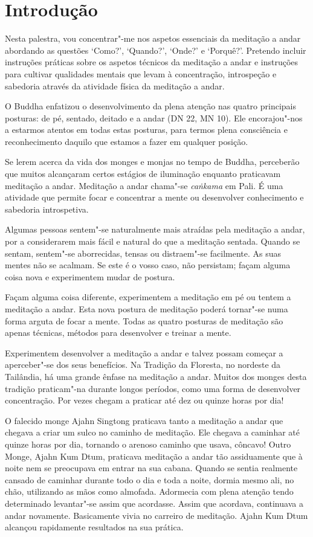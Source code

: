 \chapter{Introdução}

Nesta palestra, vou concentrar"-me nos aspetos essenciais da meditação a
andar abordando as questões `Como?', `Quando?', `Onde?' e `Porquê?'.
Pretendo incluir instruções práticas sobre os aspetos técnicos da
meditação a andar e instruções para cultivar qualidades mentais que
levam à concentração, introspeção e sabedoria através da atividade
física da meditação a andar.

O Buddha enfatizou o desenvolvimento da plena atenção nas quatro
principais posturas: de pé, sentado, deitado e a andar (DN 22, MN 10). Ele
encorajou"-nos a estarmos atentos em todas estas posturas, para termos
plena consciência e reconhecimento daquilo que estamos a fazer em
qualquer posição.

Se lerem acerca da vida dos monges e monjas no tempo de Buddha,
perceberão que muitos alcançaram certos estágios de iluminação enquanto
praticavam meditação a andar. Meditação a andar chama"-se \emph{caṅkama}
em Pali. É uma atividade que permite focar e concentrar a mente
ou desenvolver conhecimento e sabedoria introspetiva.

Algumas pessoas sentem"-se naturalmente mais atraídas pela meditação a
andar, por a considerarem mais fácil e natural do que a meditação
sentada. Quando se sentam, sentem"-se aborrecidas, tensas ou distraem"-se
facilmente. As suas mentes não se acalmam. Se este é o vosso caso, não
persistam; façam alguma coisa nova e experimentem mudar de postura.

Façam alguma coisa diferente, experimentem a meditação em pé ou tentem a
meditação a andar. Esta nova postura de meditação poderá tornar"-se numa
forma arguta de focar a mente. Todas as quatro posturas de meditação são
apenas técnicas, métodos para desenvolver e treinar a mente.

Experimentem desenvolver a meditação a andar e talvez possam começar a
aperceber"-se dos seus benefícios. Na Tradição da Floresta, no nordeste
da Tailândia, há uma grande ênfase na meditação a andar. Muitos dos
monges desta tradição praticam"-na durante longos períodos, como uma
forma de desenvolver concentração. Por vezes chegam a praticar até dez
ou quinze horas por dia!

O falecido monge Ajahn Singtong praticava tanto a meditação a
andar que chegava a criar um sulco no caminho de meditação. Ele chegava
a caminhar até quinze horas por dia, tornando o arenoso caminho que
usava, côncavo! Outro Monge, Ajahn Kum Dtum, praticava meditação
a andar tão assiduamente que à noite nem se preocupava em entrar na sua
cabana. Quando se sentia realmente cansado de caminhar durante todo o
dia e toda a noite, dormia mesmo ali, no chão, utilizando as mãos como
almofada. Adormecia com plena atenção tendo determinado levantar"-se
assim que acordasse. Assim que acordava, continuava a andar novamente.
Basicamente vivia no carreiro de meditação. Ajahn Kum Dtum
alcançou rapidamente resultados na sua prática.

